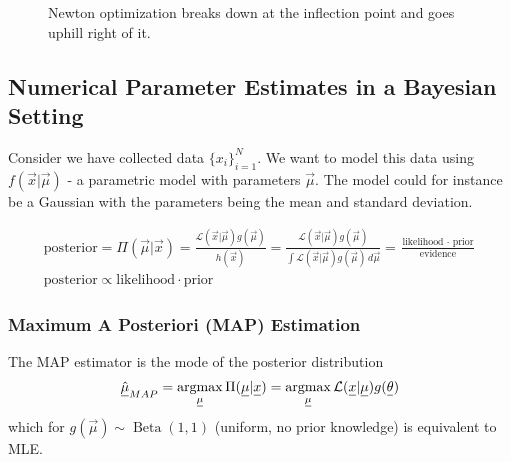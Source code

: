 \begin{figure}[!htb]
    \centering
    
    \caption{Newton optimization breaks down at the inflection point and goes uphill right of it.}
    \label{fig:newton_crit}
\end{figure}

\subsection{Numerical Parameter Estimates in a Bayesian Setting}
Consider we have collected data $\{x_i\}_{i=1}^N$.
We want to model this data using $f(\vec{x}|\vec{\mu})$ - a parametric
model with parameters $\vec{\mu}$. The model could for instance
be a Gaussian with the parameters being the mean and standard deviation.


\begin{equation}
    \begin{gathered}
        \text{posterior} = \Pi(\vec{\mu}|\vec{x}) = \frac{\mathcal{L}(\vec{x}|\vec{\mu}) g(\vec{\mu})}{h(\vec{x})} = \frac{\mathcal{L}(\vec{x}|\vec{\mu}) g(\vec{\mu})}{\int \mathcal{L}(\vec{x}|\vec{\mu}) g(\vec{\mu}) \, d\vec{\mu}} = \frac{\text{likelihood } \cdot \text{ prior}}{\text{evidence}} \\
        \text{posterior} \propto \text{likelihood} \cdot \text{prior}
    \end{gathered}
\end{equation}

\subsubsection{Maximum A Posteriori (MAP) Estimation}
The MAP estimator is the mode of the posterior distribution
\begin{equation}
    \vec{\hat{\mu}}_{MAP} = \argmax_\vec{\mu} \Pi(\vec{\mu}|\vec{x}) = \argmax_\vec{\mu} \mathcal{L}(\vec{x}|\vec{\mu}) g(\vec{\theta})
\end{equation}
which for $g(\vec{\mu}) \sim \operatorname{Beta}(1,1)$ (uniform, no prior knowledge) 
is equivalent to MLE.

